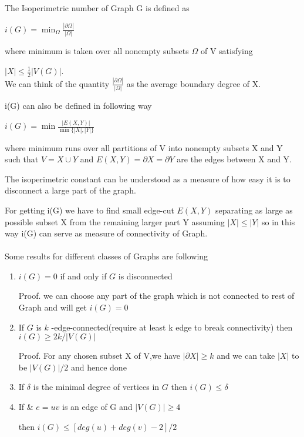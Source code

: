 \documentclass[oneside]{book}
\begin{document}
           
           The Isoperimetric number of Graph G is defined as \par
           \begin{center}
               $i(G)=\min _{\Omega} \frac{|\partial \Omega|}{|\Omega|}$
           \end{center}
           where minimum is taken over all nonempty subsets $\Omega$ of V satisfying\par $|X| \leq \frac{1}{2}|V(G)|$.
\\           We can think of the quantity  $\frac{|\partial \Omega|}{|\Omega|}$ as the average boundary degree of X. \par
           i(G) can also be defined in following way \par
           \begin{center}
               $i(G)=\min \frac{|E(X, Y)|}{\min \{|X|,|Y|\}}$
           \end{center}
            where minimum runs over all partitions of V into nonempty subsets X and Y such that  $V=X \cup Y$ and $E(X, Y)=\partial X=\partial Y$ are the edges between X and Y.
           \par
           The isoperimetric constant can be understood as a measure of how easy
it is to disconnect a large part of the graph. \par
           For getting i(G) we have to find small edge-cut $E(X, Y)$ separating as large as possible  subset X from the remaining larger part Y assuming $|X|\leq |Y|$ so in this way i(G) can serve as measure of connectivity of Graph. \\\\
           Some results for different classes of Graphs are following \par
           \begin{enumerate}
             
          
               \item  $i(G)=0$ if and only if $G$ is disconnected \par
               Proof. we can choose  any part of the graph which is not connected to rest of Graph and will get $i(G)=0$ \par
               \item  If $G$ is $k$ -edge-connected(require at least k edge to break connectivity) then $i(G) \geq 2 k /|V(G)|$ \par
        Proof. For any chosen subset X of V,we have  $|\partial X| \geq k$ and we can take $|X|$ to be $|V(G)|/2$ and hence done\par
        \item  If $\delta$ is the minimal degree of vertices in $G$ then $i(G) \leq\delta$ \par
        \item  If  & $e=u v$ is   an  edge  of G  and $|V(G)| \geq 4$ \par then  $i(G) \leq [deg(u)+deg(v)-2] / 2$ \par
            \end{enumerate}
          
\end{document}
